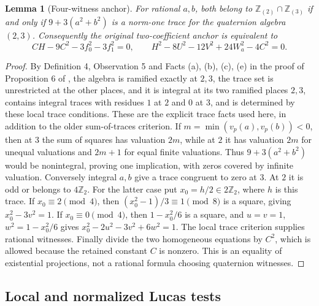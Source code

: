 \documentclass[11pt]{article}
\newtheorem{lemma}[theorem]{Lemma}
\theoremstyle{definition}
\theoremstyle{remark}
\newcommand{\Z}{\mathbb Z}
\begin{document}
\begin{lemma}[Four-witness anchor]\label{lem:quartic-anchor-four}
For rational $a,b$, both belong to $\Z_{(2)}\cap\Z_{(3)}$ if and only if
$9+3(a^2+b^2)$ is a norm-one trace for the quaternion algebra $(2,3)$.
Consequently the original two-coefficient anchor is equivalent to
\[
 CH-9C^2-3f_0^2-3f_1^2=0,\qquad
 H^2-8U^2-12V^2+24W_a^2-4C^2=0.
\]
\end{lemma}
\begin{proof}
By Definition 4, Observation 5 and Facts (a), (b), (c), (e) in the proof of
Proposition 6 of \cite{koenigsmann-defining}, the algebra is ramified
exactly at $2,3$, the trace set is unrestricted at the other places, and it
is integral at its two ramified places
$2,3$, contains integral traces with residues $1$ at $2$ and $0$ at $3$,
and is determined by these local trace conditions. These are the explicit
trace facts used here, in addition to the older sum-of-traces criterion.
If $m=\min(v_p(a),v_p(b))<0$, then at $3$ the sum of squares has valuation
$2m$, while at $2$ it has valuation $2m$ for unequal valuations and
$2m+1$ for equal finite valuations. Thus $9+3(a^2+b^2)$ would be
nonintegral, proving one implication, with zeros covered by infinite
valuation. Conversely integral $a,b$ give a trace congruent to zero at
$3$. At $2$ it is odd or belongs to $4\Z_2$. For the latter case put
$x_0=h/2\in2\Z_2$, where $h$ is this trace. If $x_0\equiv2\pmod4$, then
$(x_0^2-1)/3\equiv1\pmod8$ is a square, giving
$x_0^2-3v^2=1$. If $x_0\equiv0\pmod4$, then $1-x_0^2/6$ is a square,
and $u=v=1$, $w^2=1-x_0^2/6$ gives
$x_0^2-2u^2-3v^2+6w^2=1$. The local trace criterion supplies rational
witnesses. Finally divide the two homogeneous equations by $C^2$,
which is allowed because the retained constant $C$ is nonzero. This is
an equality of existential projections, not a rational formula choosing
quaternion witnesses.
\end{proof}

\subsection{Local and normalized Lucas tests}
\end{document}
